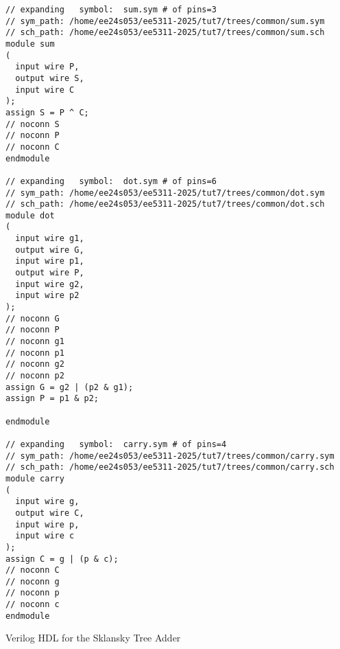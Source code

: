 \documentclass[12pt,a4paper]{article}
\begin{document}
\begin{verbatim}
// expanding   symbol:  sum.sym # of pins=3
// sym_path: /home/ee24s053/ee5311-2025/tut7/trees/common/sum.sym
// sch_path: /home/ee24s053/ee5311-2025/tut7/trees/common/sum.sch
module sum
(
  input wire P,
  output wire S,
  input wire C
);
assign S = P ^ C;
// noconn S
// noconn P
// noconn C
endmodule

// expanding   symbol:  dot.sym # of pins=6
// sym_path: /home/ee24s053/ee5311-2025/tut7/trees/common/dot.sym
// sch_path: /home/ee24s053/ee5311-2025/tut7/trees/common/dot.sch
module dot
(
  input wire g1,
  output wire G,
  input wire p1,
  output wire P,
  input wire g2,
  input wire p2
);
// noconn G
// noconn P
// noconn g1
// noconn p1
// noconn g2
// noconn p2
assign G = g2 | (p2 & g1);
assign P = p1 & p2;

endmodule

// expanding   symbol:  carry.sym # of pins=4
// sym_path: /home/ee24s053/ee5311-2025/tut7/trees/common/carry.sym
// sch_path: /home/ee24s053/ee5311-2025/tut7/trees/common/carry.sch
module carry
(
  input wire g,
  output wire C,
  input wire p,
  input wire c
);
assign C = g | (p & c);
// noconn C
// noconn g
// noconn p
// noconn c
endmodule
\end{verbatim}

\noindent Verilog HDL for the Sklansky Tree Adder
\end{document}
